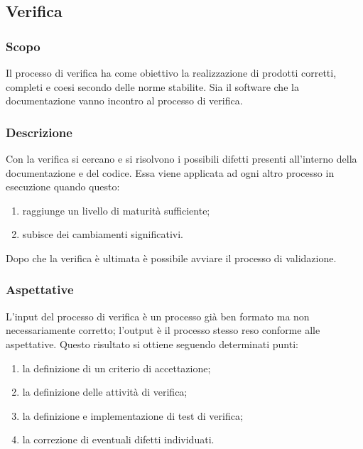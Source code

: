 \subsection{Verifica}
\subsubsection{Scopo}
Il processo di verifica ha come obiettivo la realizzazione di prodotti corretti, completi e coesi secondo delle norme stabilite. Sia il software che la documentazione vanno incontro al processo di verifica.

\subsubsection{Descrizione}
Con la verifica si cercano e si risolvono i possibili difetti presenti all'interno della documentazione e del codice. Essa viene applicata ad ogni altro processo in esecuzione quando questo:
\begin{enumerate}
    \item raggiunge un livello di maturità sufficiente;
    \item subisce dei cambiamenti significativi.
\end{enumerate} 
Dopo che la verifica è ultimata è possibile avviare il processo di validazione.  

\subsubsection{Aspettative}
L'input del processo di verifica è un processo già ben formato ma non necessariamente corretto; l'output è il processo stesso reso conforme alle aspettative. Questo risultato si ottiene seguendo determinati punti:
\begin{enumerate}
    \item la definizione di un criterio di accettazione;
    \item la definizione delle attività di verifica;
    \item la definizione e implementazione di test di verifica;
    \item la correzione di eventuali difetti individuati.
\end{enumerate}

